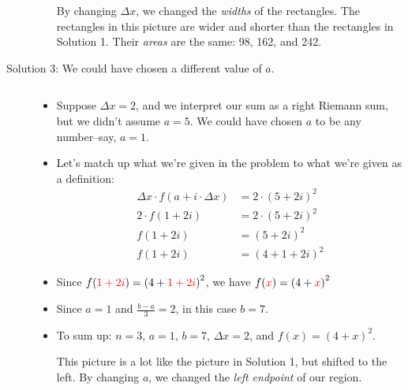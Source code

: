 \begin{solution}
\begin{description}
\begin{itemize}
\begin{center}
\end{center}
By changing $\Delta x$, we changed the \emph{widths} of the rectangles.
The rectangles in this picture are wider and shorter than the rectangles in Solution 1. Their \emph{areas} are the same: 98, 162, and 242.
\end{itemize}
\item[Solution 3: We could have chosen a different value of $a$.]
$ $
\begin{itemize}
\item Suppose $\Delta x = 2$,  and we interpret our sum as a right Riemann sum, but we didn't assume $a=5$. We could have chosen $a$ to be any number--say, $a=1$.

\item   Let's match up what we're given in the problem to what we're given as a definition:
\begin{align*}
\Delta x \cdot f\left(a+i\cdot\Delta x\right)&=2\cdot\left(5+2i\right)^2\\
2 \cdot f\left(1+2i\right)&=2\cdot\left(5+2i\right)^2\\
f\left(1+2i\right)&=\left(5+2i\right)^2\\
f\left(1+2i\right)&=\left(4+1+2i\right)^2
\end{align*}
\item Since $f(\textcolor{red}{1+2i})=\left(4+\textcolor{red}{1+2i}\right)^2$, we have $f(\textcolor{red}{x})=\left(4+\textcolor{red}{x}\right)^2$
\item Since $a=1$ and $\frac{b-a}{3}=2$, in this case $b=7$.
\item To sum up: $n=3$, $a=1$, $b=7$, $\Delta x=2$, and $f(x)=(4+x)^2$.
\begin{center}
\end{center}
This picture is a lot like the picture in Solution 1, but shifted to the left.
By changing $a$, we changed the \emph{left endpoint} of our region.
\end{itemize}


\end{description}
\end{solution}
